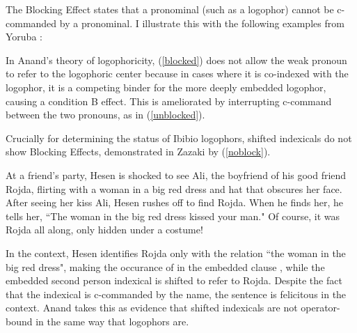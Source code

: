 \documentclass[output=paper]{langscibook}
\begin{document}
The  Blocking Effect \citep{Anand2006} states that a  pronominal (such as a logophor) cannot be c-commanded by a  pronominal. I illustrate this with the following examples from Yoruba \citep{Adesola2005}:
\begin{exe}
	\label{control}
	\label{blocked}
	\label{unblocked}
\end{exe}
In Anand's theory of logophoricity, (\ref{blocked}) does not allow the weak pronoun to refer to the logophoric center because in cases where it is co-indexed with the logophor, it is a competing binder for the more deeply embedded logophor, causing a condition B effect. This is ameliorated by interrupting c-command between the two pronouns, as in (\ref{unblocked}).

Crucially for determining the status of Ibibio logophors, shifted indexicals do not show  Blocking Effects, demonstrated in Zazaki by (\ref{noblock}).

\begin{context}
At a friend's party, Hesen is shocked to see Ali, the boyfriend of his good friend Rojda, flirting with a woman in a big red dress and hat that obscures her face. After seeing her kiss Ali, Hesen rushes off to find Rojda. When he finds her, he tells her, ``The woman in the big red dress kissed your man." Of course, it was Rojda all along, only hidden under a costume!
\end{context}
\begin{exe}
	\label{noblock}
\end{exe}
In the context, Hesen identifies Rojda only with the  relation ``the woman in the big red dress", making the occurance of  in the embedded clause , while the embedded second person indexical is shifted to refer to Rojda. Despite the fact that the  indexical is c-commanded by the  name, the sentence is felicitous in the context. Anand takes this as evidence that shifted indexicals are not operator-bound in the same way that logophors are.
\end{document}
